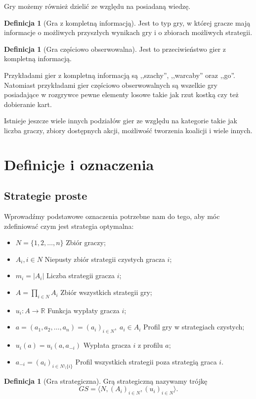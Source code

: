 \documentclass[inzynierska]{pwr_wmat_praca_dyplomowa}
\theoremstyle{plain}
\numberwithin{theorem}{chapter}
\theoremstyle{definition}
\numberwithin{theorem}{chapter}
\newtheorem{definition}[theorem]{Definicja}
\begin{document}
Gry możemy również dzielić ze względu na posiadaną wiedzę.
\begin{definition}[Gra z kompletną informacją]
	Jest to typ gry, w której gracze mają informacje o możliwych przyszłych wynikach gry i o zbiorach możliwych strategii.
\end{definition}
\begin{definition}[Gra częściowo obserwowalna]
	Jest to przeciwieństwo gier z kompletną informacją.
\end{definition}
\noindent
Przykładami gier z kompletną informacją są ,,szachy'', ,,warcaby'' oraz ,,go''.
Natomiast przykładami gier częściowo obserwowalnych są wszelkie gry posiadające w rozgrywce pewne elementy losowe takie jak rzut kostką czy też dobieranie kart. 

Istnieje jeszcze wiele innych podziałów gier ze względu na kategorie takie jak liczba graczy, zbiory dostępnych akcji, możliwość tworzenia koalicji i wiele innych.
\section{Definicje i oznaczenia}
\subsection{Strategie proste}
Wprowadźmy podstawowe oznaczenia potrzebne nam do tego, aby móc zdefiniować czym jest strategia optymalna:
\begin{itemize}
	\item $ N = \{1, 2, \dots, n\} $ \pauza Zbiór graczy;
	\item $A_i, i \in N $ \pauza Niepusty zbiór strategii  czystych gracza $i$;
	\item $m_i = |A_i|$ \pauza Liczba strategii gracza $i$;
	\item $A = \prod_{i \in N} A_i$ \pauza Zbiór wszystkich strategii gry;
	\item $u_i : A \rightarrow \mathbb{R} $ \pauza Funkcja wypłaty gracza $i$;
	\item $a=(a_1, a_2, \dots, a_n)=(a_i)_{i \in N},\; a_i \in A_i$ \pauza Profil gry w strategiach czystych;
	\item $u_i(a) = u_i(a, a_{-i})$ \pauza Wypłata gracza $i$ z profilu $a$;
	\item $a_{-i} = (a_i)_{i\in N \setminus \{i\}}$ \pauza Profil wszystkich strategii poza strategią graca $i$.
\end{itemize}
	\begin{definition}[Gra strategiczna]
		Grą strategiczną nazywamy trójkę 
		\begin{equation*}
					GS = \langle N,  (A_i)_{i \in N}, (u_i)_{i \in N} \rangle.
		\end{equation*}
	\end{definition}
	
\end{document}

